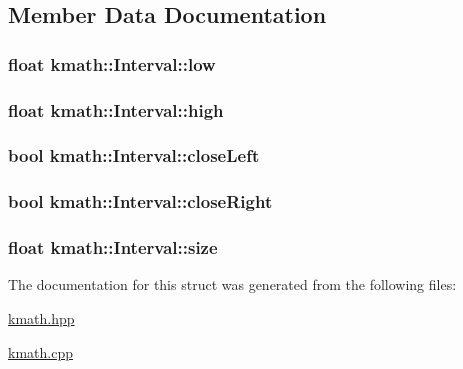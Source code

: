 \subsection{Member Data Documentation}
\hypertarget{structkmath_1_1_interval_ad575587eae91b8bce8f5ab4578f96d2b}{
\subsubsection[{low}]{\setlength{\rightskip}{0pt plus 5cm}float {\bf kmath\-::\-Interval\-::low}}}\label{structkmath_1_1_interval_ad575587eae91b8bce8f5ab4578f96d2b}
\hypertarget{structkmath_1_1_interval_ab89c246d6c21a786d5f09f837ff6d104}{
\subsubsection[{high}]{\setlength{\rightskip}{0pt plus 5cm}float {\bf kmath\-::\-Interval\-::high}}}\label{structkmath_1_1_interval_ab89c246d6c21a786d5f09f837ff6d104}
\hypertarget{structkmath_1_1_interval_a8301dbeccf9a042992eeb8bc4873fe83}{
\subsubsection[{close\-Left}]{\setlength{\rightskip}{0pt plus 5cm}bool {\bf kmath\-::\-Interval\-::close\-Left}}}\label{structkmath_1_1_interval_a8301dbeccf9a042992eeb8bc4873fe83}
\hypertarget{structkmath_1_1_interval_aa4962a6e38a17ff02321589ba9a4f990}{
\subsubsection[{close\-Right}]{\setlength{\rightskip}{0pt plus 5cm}bool {\bf kmath\-::\-Interval\-::close\-Right}}}\label{structkmath_1_1_interval_aa4962a6e38a17ff02321589ba9a4f990}
\hypertarget{structkmath_1_1_interval_a2988525850f7d1fb59b26efb1ee2b253}{
\subsubsection[{size}]{\setlength{\rightskip}{0pt plus 5cm}float {\bf kmath\-::\-Interval\-::size}}}\label{structkmath_1_1_interval_a2988525850f7d1fb59b26efb1ee2b253}


The documentation for this struct was generated from the following files\-:\begin{DoxyCompactItemize}
\item 
\hyperlink{kmath_8hpp}{kmath.\-hpp}\item 
\hyperlink{kmath_8cpp}{kmath.\-cpp}\end{DoxyCompactItemize}
